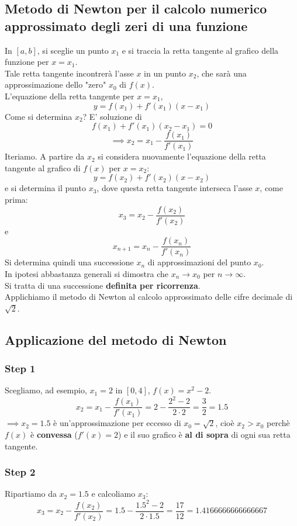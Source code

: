 \documentclass[../../main.tex]{subfiles}
\begin{document}
\subsection{Metodo di Newton per il calcolo numerico approssimato degli zeri di una funzione}
In $[a, b]$, si sceglie un punto $x_1$ e si traccia la retta tangente al grafico della funzione per $x = x_1$.\\
Tale retta tangente incontrerà l'asse $x$ in un punto $x_2$, che sarà una approssimazione dello "zero" $x_0$ di $f(x)$.\\
L'equazione della retta tangente per $x = x_1$,
\[
    y = f(x_1) + f'(x_1)(x-x_1)
\]
Come si determina $x_2$? E' soluzione di
\[
    f(x_1) + f'(x_1)(x_2-x_1) = 0
\]
\[
    \implies x_2 = x_1 - \dfrac{f(x_1)}{f'(x_1)}
\]
Iteriamo. A partire da $x_2$ si considera nuovamente l'equazione della retta tangente al grafico di $f(x)$ per $x = x_2$:
\[
    y = f(x_2) + f'(x_2)(x-x_2)
\]
e si determina il punto $x_3$, dove questa retta tangente interseca l'asse $x$, come prima:
\[
    x_3 = x_2 - \dfrac{f(x_2)}{f'(x_2)}
\]
e
\[
    x_{n+1} = x_n - \dfrac{f(x_n)}{f'(x_n)}
\]
Si determina quindi una successione $x_n$ di approssimazioni del punto $x_0$.\\
In ipotesi abbastanza generali si dimostra che $x_n\to x_0$ per $n\to\infty$.\\
Si tratta di una successione \textbf{definita per ricorrenza}.\\
Applichiamo il metodo di Newton al calcolo approssimato delle cifre decimale di $\sqrt{2}$.
\subsection{Applicazione del metodo di Newton}
\subsubsection{Step 1}
Scegliamo, ad esempio, $x_1 = 2$ in $[0, 4]$, $f(x) = x^2 - 2$.
\[
    x_2 = x_1 - \dfrac{f(x_1)}{f'(x_1)} = 2 - \dfrac{2^2 - 2}{2\cdot2} = \dfrac{3}{2} = 1.5
\]
$\implies x_2 = 1.5$ è un'approssimazione per eccesso di $x_0 = \sqrt{2}$, cioè $x_2 > x_0$ perchè
$f(x)$ è \textbf{convessa} ($f'(x)=2$) e il suo grafico è \textbf{al di sopra}  di ogni sua retta tangente.\\
\subsubsection{Step 2}
Ripartiamo da $x_2 = 1.5$ e calcoliamo $x_3$:
\[
    x_3 = x_2 - \dfrac{f(x_2)}{f'(x_2)} = 1.5 - \dfrac{1.5^2 - 2}{2\cdot1.5} = \dfrac{17}{12} = 1.4166666666666667
\]
\end{document}
